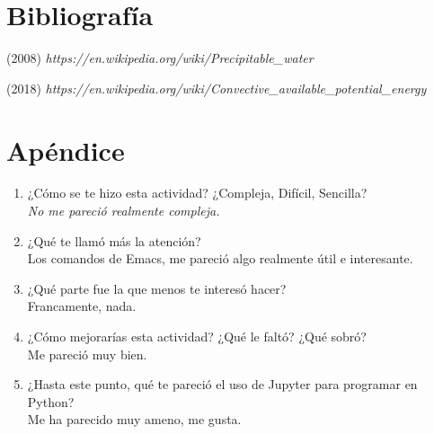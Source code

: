 \documentclass{article}
\begin{document}
\begin{doublespace}
\begin{itemize}
\section{Bibliografía}
(2008) \textit{https://en.wikipedia.org/wiki/Precipitable\_water}

(2018) \textit{https://en.wikipedia.org/wiki/Convective\_available\_potential\_energy}

\section{Apéndice}
\begin{enumerate}
\item ¿Cómo se te hizo esta actividad? ¿Compleja, Difícil, Sencilla?
\\
\textit{No me pareció realmente compleja.}

\item ¿Qué te llamó más la atención? 
\\
Los comandos de Emacs, me pareció algo realmente útil e interesante.

\item ¿Qué parte fue la que menos te interesó hacer?
\\
Francamente, nada.
\item ¿Cómo mejorarías esta actividad? ¿Qué le faltó? ¿Qué sobró?
\\
Me pareció muy bien.

\item ¿Hasta este punto, qué te pareció el uso de Jupyter para programar en Python?
\\
Me ha parecido muy ameno, me gusta.

\end{enumerate}

\end{itemize}
\end{doublespace}
\end{document}
